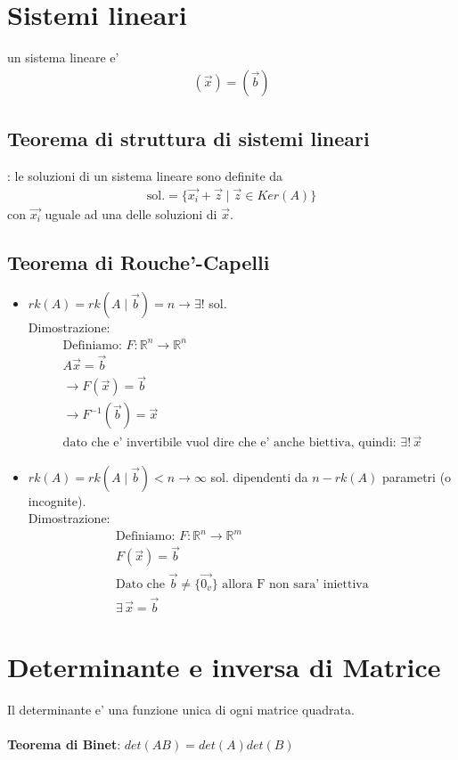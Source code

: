 \documentclass[10pt]{extarticle}
\begin{document}
\section{Sistemi lineari}
un sistema lineare e'
\begin{align*}
    [A](\vec{x})=(\vec{b})
\end{align*}
\subsection{Teorema di struttura di sistemi lineari}: le soluzioni di un sistema lineare sono definite da
\begin{align*}
    \text{sol.}=\{\vec{x_i}+\vec{z} \mid \vec{z}\in Ker(A)\}
\end{align*}
con $\vec{x_i}$ uguale ad una delle soluzioni di $\vec{x}$.
\subsection{Teorema di Rouche'-Capelli}
\begin{itemize}
    \item $rk(A)=rk(A\mid \vec{b})=n \to \exists! $ sol. \\
    Dimostrazione:
    \begin{align*}
        \text{Definiamo: } F : \mathbb{R}^n \to \mathbb{R}^n \\
        A\vec{x}=\vec{b}\\
        \to F(\vec{x})=\vec{b} \\
        \to F^{-1}(\vec{b})=\vec{x} \\
        \text{dato che e' invertibile vuol dire che e' anche biettiva, quindi: } \exists! \, \vec{x}
    \end{align*}
    \item $rk(A)=rk(A\mid \vec{b}) < n \to \infty $ sol. dipendenti da $n-rk(A)$ parametri (o incognite). \\
    Dimostrazione: 
    \begin{align*}
            \text{Definiamo: } F : \mathbb{R}^n \to \mathbb{R}^m \\
            F(\vec{x})=\vec{b}\\
            \text{Dato che $\vec{b}\neq\{\vec{0_v}\}$ allora F non sara' iniettiva} \\
            \exists \, \vec{x}=\vec{b}
    \end{align*}
\end{itemize}

\section{Determinante e inversa di Matrice}
Il determinante e' una funzione unica di ogni matrice quadrata. \\
\vspace{1em} \\
\textbf{Teorema di Binet}: $det(AB)=det(A)det(B)$
\vspace{1em}
\end{document}
